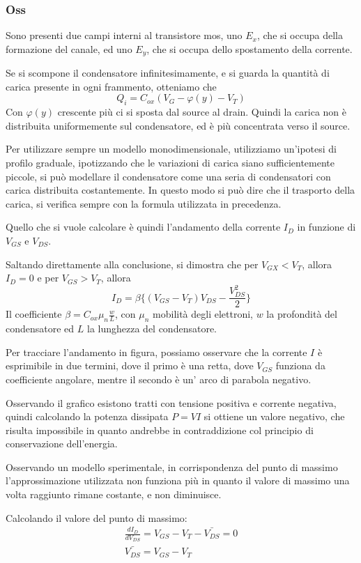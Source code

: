 \documentclass[../template]{subfiles}
\begin{document}
\subsubsection{Oss}
Sono presenti due campi interni al transistore mos, uno $E_x$, che si occupa della formazione del canale, ed uno $E_y$, che si occupa dello spostamento della corrente.

Se si scompone il condensatore infinitesimamente, e si guarda la quantità di carica presente in ogni frammento, otteniamo che
\[
    Q_i = C_{ox} (V_G - \varphi(y) - V_T)
\]
Con $\varphi(y)$ crescente più ci si sposta dal source al drain. Quindi la carica non è distribuita uniformemente sul condensatore, ed è più concentrata verso il source.

Per utilizzare sempre un modello monodimensionale, utilizziamo un'ipotesi di profilo graduale, ipotizzando che le variazioni di carica siano sufficientemente piccole, si può modellare il condensatore come una seria di condensatori con carica distribuita costantemente.
In questo modo si può dire che il trasporto della carica, si verifica sempre con la formula utilizzata in precedenza.

Quello che si vuole calcolare è quindi l'andamento della corrente $I_D$ in funzione di $V_{GS}$ e $V_{DS}$.

Saltando direttamente alla conclusione, si dimostra che per $V_{GX} < V_T$, allora $I_D = 0$ e per $V_{GS} > V_T$, allora
\[
    I_D = \beta \big\{ (V_{GS} - V_T) V_{DS} - \frac{V_{DS}^2}{2}\big\}
\]
Il coefficiente $\beta = C_{ox} \mu_n \frac{w}{L}$, con $\mu_n$ mobilità degli elettroni, $w$ la profondità del condensatore ed $L$ la lunghezza del condensatore.

Per tracciare l'andamento in figura, possiamo osservare che la corrente $I$ è esprimibile in due termini, dove il primo è una retta, dove $V_{GS}$ funziona da coefficiente angolare, mentre il secondo è un' arco di parabola negativo.

Osservando il grafico esistono tratti con tensione positiva e corrente negativa, quindi calcolando la potenza dissipata $P = VI$ si ottiene un valore negativo, che risulta impossibile in quanto andrebbe in contraddizione col principio di conservazione dell'energia.

Osservando un modello sperimentale, in corrispondenza del punto di massimo l'approssimazione utilizzata non funziona più in quanto il valore di massimo una volta raggiunto rimane costante, e non diminuisce.

Calcolando il valore del punto di massimo:
\begin{align*}
    \frac{dI_D}{dV_{DS}} = V_{GS} - V_T - \bar{V_{DS}} = 0
    \\
    \bar{V_{DS}} = V_{GS} - V_T
\end{align*}
\end{document}
